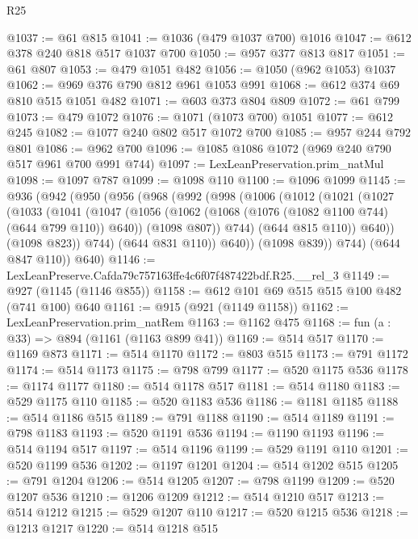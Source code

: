 \begin{lexlean}{R25}
\begin{coremodule}
@1037 := @61 @815
@1041 := @1036 (@479 @1037 @700) @1016
@1047 := @612 @378 @240 @818 @517 @1037 @700
@1050 := @957 @377 @813 @817
@1051 := @61 @807
@1053 := @479 @1051 @482
@1056 := @1050 (@962 @1053) @1037
@1062 := @969 @376 @790 @812 @961 @1053 @991
@1068 := @612 @374 @69 @810 @515 @1051 @482
@1071 := @603 @373 @804 @809
@1072 := @61 @799
@1073 := @479 @1072
@1076 := @1071 (@1073 @700) @1051
@1077 := @612 @245
@1082 := @1077 @240 @802 @517 @1072 @700
@1085 := @957 @244 @792 @801
@1086 := @962 @700
@1096 := @1085 @1086 @1072 (@969 @240 @790 @517 @961 @700 @991 @744)
@1097 := LexLeanPreservation.prim_natMul
@1098 := @1097 @787
@1099 := @1098 @110
@1100 := @1096 @1099
@1145 := @936
    (@942
      (@950
        (@956
          (@968
            (@992
              (@998
                (@1006
                  (@1012
                    (@1021
                      (@1027
                        (@1033
                          (@1041
                            (@1047
                              (@1056
                                (@1062 (@1068 (@1076 (@1082 @1100 @744) (@644 @799 @110)) @640))
                                (@1098 @807))
                              @744)
                            (@644 @815 @110))
                          @640))
                      (@1098 @823))
                    @744)
                  (@644 @831 @110))
                @640))
            (@1098 @839))
          @744)
        (@644 @847 @110))
      @640)
@1146 := LexLeanPreserve.Cafda79c757163ffe4c6f07f487422bdf.R25.__rel_3
@1149 := @927 (@1145 (@1146 @855))
@1158 := @612 @101 @69 @515 @515 @100 @482 (@741 @100) @640
@1161 := @915 (@921 (@1149 @1158))
@1162 := LexLeanPreservation.prim_natRem
@1163 := @1162 @475
@1168 := fun (a : @33) => @894 (@1161 (@1163 @899 @41))
@1169 := @514 @517
@1170 := @1169 @873
@1171 := @514 @1170
@1172 := @803 @515
@1173 := @791 @1172
@1174 := @514 @1173
@1175 := @798 @799
@1177 := @520 @1175 @536
@1178 := @1174 @1177
@1180 := @514 @1178 @517
@1181 := @514 @1180
@1183 := @529 @1175 @110
@1185 := @520 @1183 @536
@1186 := @1181 @1185
@1188 := @514 @1186 @515
@1189 := @791 @1188
@1190 := @514 @1189
@1191 := @798 @1183
@1193 := @520 @1191 @536
@1194 := @1190 @1193
@1196 := @514 @1194 @517
@1197 := @514 @1196
@1199 := @529 @1191 @110
@1201 := @520 @1199 @536
@1202 := @1197 @1201
@1204 := @514 @1202 @515
@1205 := @791 @1204
@1206 := @514 @1205
@1207 := @798 @1199
@1209 := @520 @1207 @536
@1210 := @1206 @1209
@1212 := @514 @1210 @517
@1213 := @514 @1212
@1215 := @529 @1207 @110
@1217 := @520 @1215 @536
@1218 := @1213 @1217
@1220 := @514 @1218 @515

\end{coremodule}
\end{lexlean}
